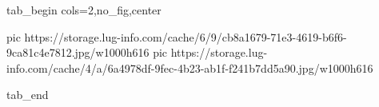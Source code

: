  
 
 
 
 

\ifcmt
  tab_begin cols=2,no_fig,center

     pic https://storage.lug-info.com/cache/6/9/cb8a1679-71e3-4619-b6f6-9ca81c4e7812.jpg/w1000h616%
		 pic https://storage.lug-info.com/cache/4/a/6a4978df-9fec-4b23-ab1f-f241b7dd5a90.jpg/w1000h616%

  tab_end
\fi
